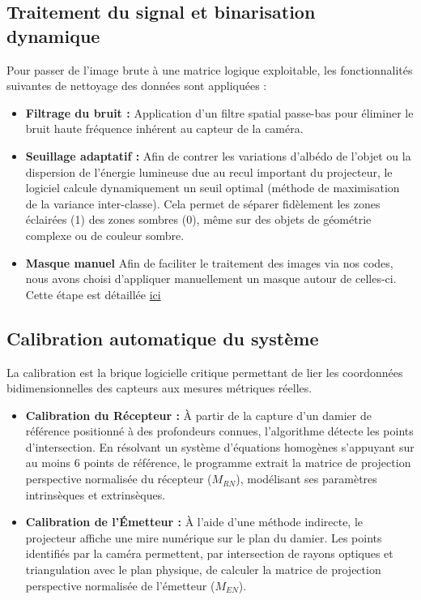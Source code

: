 \documentclass[10pt]{article} %
\begin{document}
\subsection{Traitement du signal et binarisation dynamique}
Pour passer de l'image brute à une matrice logique exploitable, les fonctionnalités suivantes de nettoyage des données sont appliquées :
\begin{itemize}
    \item \textbf{Filtrage du bruit :} Application d'un filtre spatial passe-bas pour éliminer le bruit haute fréquence inhérent au capteur de la caméra.
    \item \textbf{Seuillage adaptatif :} Afin de contrer les variations d'albédo de l'objet ou la dispersion de l'énergie lumineuse due au recul important du projecteur, le logiciel calcule dynamiquement un seuil optimal (méthode de maximisation de la variance inter-classe). Cela permet de séparer fidèlement les zones éclairées (1) des zones sombres (0), même sur des objets de géométrie complexe ou de couleur sombre.
    \item \textbf{Masque manuel}
    Afin de faciliter le traitement des images via nos codes, nous avons choisi d'appliquer manuellement un masque autour de celles-ci. Cette étape est détaillée \hyperref[ici]{ici}
\end{itemize}

\subsection{Calibration automatique du système}
La calibration est la brique logicielle critique permettant de lier les coordonnées bidimensionnelles des capteurs aux mesures métriques réelles.
\begin{itemize}
    \item \textbf{Calibration du Récepteur :} À partir de la capture d'un damier de référence positionné à des profondeurs connues, l'algorithme détecte les points d'intersection. En résolvant un système d'équations homogènes s'appuyant sur au moins 6 points de référence, le programme extrait la matrice de projection perspective normalisée du récepteur ($M_{RN}$), modélisant ses paramètres intrinsèques et extrinsèques.
    \item \textbf{Calibration de l'Émetteur :} À l'aide d'une méthode indirecte, le projecteur affiche une mire numérique sur le plan du damier. Les points identifiés par la caméra permettent, par intersection de rayons optiques et triangulation avec le plan physique, de calculer la matrice de projection perspective normalisée de l'émetteur ($M_{EN}$).
\end{itemize}
\end{document}
